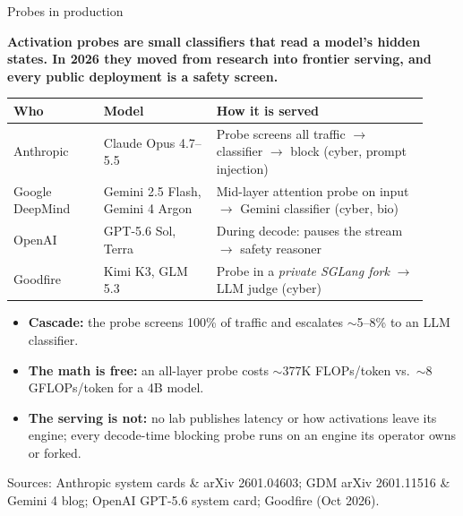   \begin{block}{Probes in production}

    \textbf{Activation probes are small classifiers that read a model's hidden
    states. In 2026 they moved from research into frontier serving, and every
    public deployment is a safety screen.}

    \vspace{0.6em}
    \begin{table}
      \centering
      \begin{tabular}{@{}p{0.2\linewidth} p{0.25\linewidth} p{0.47\linewidth}@{}}
        \toprule
        \textbf{Who} & \textbf{Model} & \textbf{How it is served} \\
        \midrule
        Anthropic & Claude Opus 4.7--5.5 & Probe screens all traffic $\rightarrow$ classifier $\rightarrow$ block (cyber, prompt injection) \\
        Google DeepMind & Gemini 2.5 Flash, Gemini 4 Argon & Mid-layer attention probe on input $\rightarrow$ Gemini classifier (cyber, bio) \\
        OpenAI & GPT-5.6 Sol, Terra & During decode: pauses the stream $\rightarrow$ safety reasoner \\
        Goodfire & Kimi K3, GLM 5.3 & Probe in a \emph{private SGLang fork} $\rightarrow$ LLM judge (cyber) \\
        \bottomrule
      \end{tabular}
    \end{table}

    \begin{itemize}
      \item \textbf{Cascade:} the probe screens 100\% of traffic and escalates
        ${\sim}$5--8\% to an LLM classifier.
      \item \textbf{The math is free:} an all-layer probe costs ${\sim}$377K
        FLOPs/token vs.\ ${\sim}$8 GFLOPs/token for a 4B model.
      \item \textbf{The serving is not:} no lab publishes latency or how
        activations leave its engine; every decode-time blocking probe runs on
        an engine its operator owns or forked.
    \end{itemize}

    {\footnotesize Sources: Anthropic system cards \& arXiv 2601.04603; GDM
    arXiv 2601.11516 \& Gemini 4 blog; OpenAI GPT-5.6 system card; Goodfire
    (Oct 2026).}

  \end{block}
